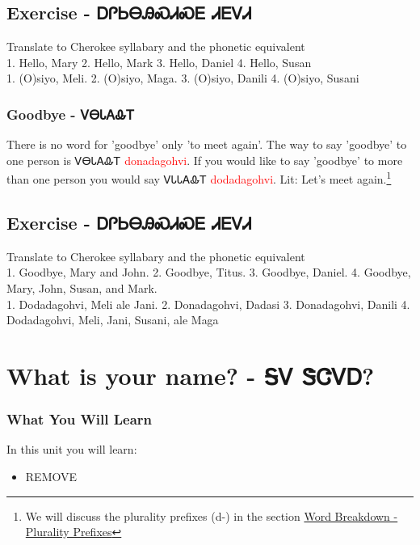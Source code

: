 {\section{Exercise - ᎠᎵᏏᎾᎯᏍᏗᏍᎬ ᏗᎬᏙᏗ}
Translate to Cherokee syllabary and the phonetic equivalent\\
1. Hello, Mary 2. Hello, Mark 3. Hello, Daniel 4. Hello, Susan\\
1. (O)siyo, Meli. 2. (O)siyo, Maga. 3. (O)siyo, Danili 4. (O)siyo, Susani\\
\subsection{Goodbye - ᏙᎾᏓᎪᎲᎢ}
There is no word for 'goodbye' only 'to meet again'. The way to say 'goodbye' to one person is ᏙᎾᏓᎪᎲᎢ \textcolor{red}{donadagohvi}. If you would like to say 'goodbye' to more than one person you would say ᏙᏓᏓᎪᎲᎢ \textcolor{red}{dodadagohvi}.  Lit: Let's meet again.\footnote{We will discuss the plurality prefixes (d-) in the section \hyperref[sec:wordBreakdownPluralityPrefixes]{Word Breakdown - Plurality Prefixes}}
\section{Exercise - ᎠᎵᏏᎾᎯᏍᏗᏍᎬ ᏗᎬᏙᏗ}
Translate to Cherokee syllabary and the phonetic equivalent\\
1. Goodbye, Mary and John. 2. Goodbye, Titus. 3. Goodbye, Daniel. 4. Goodbye, Mary, John, Susan, and Mark.\\
1. Dodadagohvi, Meli ale Jani. 2. Donadagohvi, Dadasi 3. Donadagohvi, Danili 4. Dodadagohvi, Meli, Jani, Susani, ale Maga\\
\chapter{What is your name? - ᎦᏙ ᏕᏣᏙᎠ?}
\subsection{What You Will Learn}
In this unit you will learn:
\begin{itemize}
\item REMOVE
\end{itemize}\newpage

}
